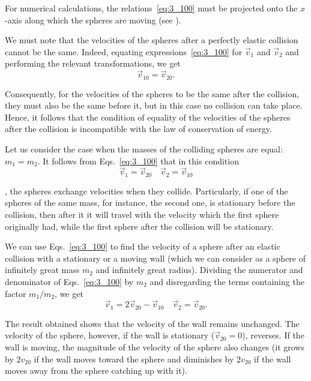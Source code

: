 \noindent
For numerical calculations, the relations~\eqref{eq:3_100} must be projected onto the $x$-axis along which the spheres are moving (see ).

We must note that the velocities of the spheres after a perfectly elastic collision cannot be the same. Indeed, equating expressions~\eqref{eq:3_100} for $\vec{v}_1$ and $\vec{v}_2$ and performing the relevant transformations, we get
\begin{equation*}
\vec{v}_{10} = \vec{v}_{20}.
\end{equation*}

\noindent
Consequently, for the velocities of the spheres to be the same after the collision, they must also be the same before it, but in this case no collision can take place. Hence, it follows that the condition of equality of the velocities of the spheres after the collision is incompatible with the law of conservation of energy.

Let us consider the case when the masses of the colliding spheres are equal: $m_1=m_2$. It follows from Eqs.~\eqref{eq:3_100} that in this condition
\begin{equation*}
\vec{v}_{1} = \vec{v}_{20}\quad \vec{v}_{2} = \vec{v}_{10}
\end{equation*}

\noindent
\ie, the spheres exchange velocities when they collide. Particularly, if one of the spheres of the same mass, for instance, the second one, is stationary before the collision, then after it it will travel with the velocity which the first sphere originally had, while the first sphere after the collision will be stationary.

We can use Eqs.~\eqref{eq:3_100} to find the velocity of a sphere after an elastic collision with a stationary or a moving wall (which we can consider as a sphere of infinitely great mass $m_2$ and infinitely great radius). Dividing the numerator and denominator of Eqs.~\eqref{eq:3_100} by $m_2$ and disregarding the terms containing the factor $m_1/m_2$, we get
\begin{equation*}
\vec{v}_{1} = 2\vec{v}_{20}-\vec{v}_{10}\quad \vec{v}_{2} = \vec{v}_{20}.
\end{equation*}

\noindent
The result obtained shows that the velocity of the wall remains unchanged. The velocity of the sphere, however, if the wall is stationary ($\vec{v}_{20}=0$), reverses. If the wall is moving, the magnitude of the velocity of the sphere also changes (it grows by $2v_{20}$ if the wall moves toward the sphere and diminishes by $2v_{20}$ if the wall moves away from the sphere catching up with it).


